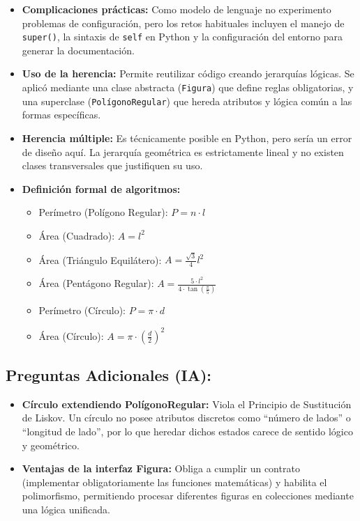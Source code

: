 \documentclass[12pt, letterpaper]{article}
\begin{document}
\begin{itemize}
    \item[\textbf{a)}] \textbf{Complicaciones prácticas:} Como modelo de lenguaje no experimento problemas de configuración, pero los retos habituales incluyen el manejo de \texttt{super()}, la sintaxis de \texttt{self} en Python y la configuración del entorno para generar la documentación.
    
    \item[\textbf{b)}] \textbf{Uso de la herencia:} Permite reutilizar código creando jerarquías lógicas.
      Se aplicó mediante una clase abstracta (\texttt{Figura}) que define reglas obligatorias, y una superclase (\texttt{PolígonoRegular}) que hereda atributos y lógica común a las formas específicas.
    
    \item[\textbf{c)}] \textbf{Herencia múltiple:} Es técnicamente posible en Python, pero sería un error de diseño aquí. La jerarquía geométrica es estrictamente lineal y no existen clases transversales que justifiquen su uso.
    
    \item[\textbf{d)}] \textbf{Definición formal de algoritmos:}
    \begin{itemize}
        \item Perímetro (Polígono Regular): $P = n \cdot l$
        \item Área (Cuadrado): $A = l^2$
        \item Área (Triángulo Equilátero): $A = \frac{\sqrt{3}}{4} l^2$
        \item Área (Pentágono Regular): $A = \frac{5 \cdot l^2}{4 \cdot \tan(\frac{\pi}{5})}$
        \item Perímetro (Círculo): $P = \pi \cdot d$
        \item Área (Círculo): $A = \pi \cdot \left(\frac{d}{2}\right)^2$
    \end{itemize}
\end{itemize}

\subsection*{Preguntas Adicionales (IA):}
\begin{itemize}
    \item[\textbf{a)}] \textbf{Círculo extendiendo PolígonoRegular:} Viola el Principio de Sustitución de Liskov. Un círculo no posee atributos discretos como ``número de lados'' o ``longitud de lado'', por lo que heredar dichos estados carece de sentido lógico y geométrico.
    
    \item[\textbf{b)}] \textbf{Ventajas de la interfaz Figura:} Obliga a cumplir un contrato (implementar obligatoriamente las funciones matemáticas) y habilita el polimorfismo, permitiendo procesar diferentes figuras en colecciones mediante una lógica unificada.
\end{itemize}
\end{document}
